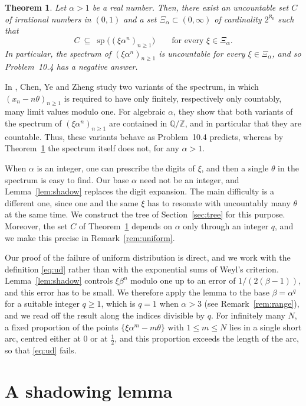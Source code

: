 \documentclass[11pt,reqno]{amsart}
\newtheorem{theorem}{Theorem}[section]
\theoremstyle{definition}
\theoremstyle{remark}
\numberwithin{equation}{section}
\DeclareMathOperator{\spec}{sp}
\newcommand{\Z}{\mathbb{Z}}
\newcommand{\Q}{\mathbb{Q}}
\begin{document}
\begin{theorem}\label{thm:main}
Let $\alpha>1$ be a real number. Then, there exist an uncountable set $C$ of irrational numbers in $(0,1)$ and a set $\Xi_\alpha\subset(0,\infty)$ of cardinality $2^{\aleph_0}$ such that
\[
C\ \subseteq\ \spec\bigl((\xi\alpha^n)_{n\ge1}\bigr)\qquad\text{for every }\xi\in\Xi_\alpha .
\]
In particular, the spectrum of $(\xi\alpha^n)_{n\ge1}$ is uncountable for every $\xi\in\Xi_\alpha$, and so Problem~\textup{10.4} has a negative answer.
\end{theorem}

In \cite{CYZ}, Chen, Ye and Zheng study two variants of the spectrum, in which $(x_n-n\theta)_{n\ge1}$ is required to have only finitely, respectively only countably, many limit values modulo one. For algebraic $\alpha$, they show that both variants of the spectrum of $(\xi\alpha^n)_{n\ge1}$ are contained in $\Q/\Z$, and in particular that they are countable. Thus, these variants behave as Problem~\textup{10.4} predicts, whereas by Theorem~\ref{thm:main} the spectrum itself does not, for any $\alpha>1$.

When $\alpha$ is an integer, one can prescribe the digits of $\xi$, and then a single $\theta$ in the spectrum is easy to find. Our base $\alpha$ need not be an integer, and Lemma~\ref{lem:shadow} replaces the digit expansion. The main difficulty is a different one, since one and the same $\xi$ has to resonate with uncountably many $\theta$ at the same time. We construct the tree of Section~\ref{sec:tree} for this purpose. Moreover, the set $C$ of Theorem~\ref{thm:main} depends on $\alpha$ only through an integer $q$, and we make this precise in Remark~\ref{rem:uniform}.

Our proof of the failure of uniform distribution is direct, and we work with the definition \eqref{eq:ud} rather than with the exponential sums of Weyl's criterion. Lemma~\ref{lem:shadow} controls $\xi\beta^n$ modulo one up to an error of $1/(2(\beta-1))$, and this error has to be small. We therefore apply the lemma to the base $\beta=\alpha^q$ for a suitable integer $q\ge1$, which is $q=1$ when $\alpha>3$ (see Remark~\ref{rem:range}), and we read off the result along the indices divisible by $q$. For infinitely many $N$, a fixed proportion of the points $\{\xi\alpha^m-m\theta\}$ with $1\le m\le N$ lies in a single short arc, centred either at $0$ or at $\tfrac12$, and this proportion exceeds the length of the arc, so that \eqref{eq:ud} fails.

\section{A shadowing lemma}
\end{document}
